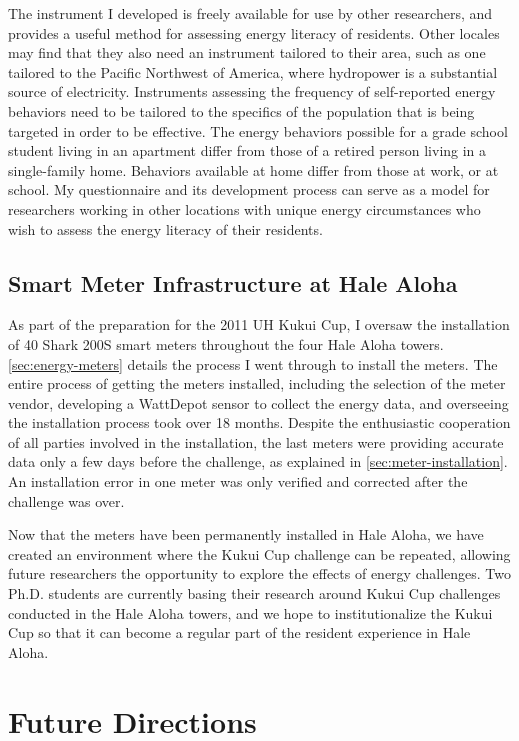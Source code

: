 The instrument I developed is freely available for use by other researchers, and provides a useful method for assessing energy literacy of \Hawaii residents. Other locales may find that they also need an instrument tailored to their area, such as one tailored to the Pacific Northwest of America, where hydropower is a substantial source of electricity. Instruments assessing the frequency of self-reported energy behaviors need to be tailored to the specifics of the population that is being targeted in order to be effective. The energy behaviors possible for a grade school student living in an apartment differ from those of a retired person living in a single-family home. Behaviors available at home differ from those at work, or at school. My questionnaire and its development process can serve as a model for researchers working in other locations with unique energy circumstances who wish to assess the energy literacy of their residents.


\subsection{Smart Meter Infrastructure at Hale Aloha}

As part of the preparation for the 2011 UH Kukui Cup, I oversaw the installation of 40 Shark 200S smart meters throughout the four Hale Aloha towers. \autoref{sec:energy-meters} details the process I went through to install the meters. The entire process of getting the meters installed, including the selection of the meter vendor, developing a WattDepot sensor to collect the energy data, and overseeing the installation process took over 18 months. Despite the enthusiastic cooperation of all parties involved in the installation, the last meters were providing accurate data only a few days before the challenge, as explained in \autoref{sec:meter-installation}. An installation error in one meter was only verified and corrected after the challenge was over.

Now that the meters have been permanently installed in Hale Aloha, we have created an environment where the Kukui Cup challenge can be repeated, allowing future researchers the opportunity to explore the effects of energy challenges. Two Ph.D. students are currently basing their research around Kukui Cup challenges conducted in the Hale Aloha towers, and we hope to institutionalize the Kukui Cup so that it can become a regular part of the resident experience in Hale Aloha.


\section{Future Directions}

